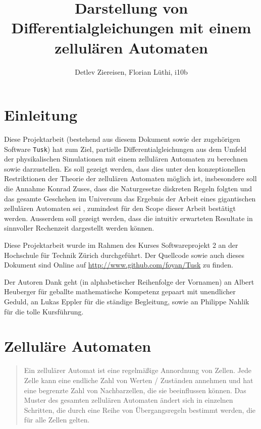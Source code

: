 \documentclass[11pt]{article} %
\title{Darstellung von Differentialgleichungen mit einem zellulären Automaten}
\author{Detlev Ziereisen, Florian Lüthi, i10b}
\theoremstyle{definition}
\begin{document}
\maketitle

\tableofcontents

\section{Einleitung}

Diese Projektarbeit (bestehend aus diesem Dokument sowie der zugehörigen Software {\tt Tusk}) hat zum Ziel, partielle Differentialgleichungen aus dem Umfeld der physikalischen Simulationen mit einem zellulären Automaten zu berechnen sowie darzustellen. Es soll gezeigt werden, dass dies unter den konzeptionellen Restriktionen der Theorie der zellulären Automaten möglich ist, insbesondere soll die Annahme Konrad Zuses, dass die Naturgesetze diskreten Regeln folgten und das gesamte Geschehen im Universum das Ergebnis der Arbeit eines gigantischen zellulären Automaten sei \cite{wiki:zellautomat, zuse1969}, zumindest für den Scope dieser Arbeit bestätigt werden. Ausserdem soll gezeigt werden, dass die intuitiv erwarteten Resultate in sinnvoller Rechenzeit dargestellt werden können.

Diese Projektarbeit wurde im Rahmen des Kurses Softwareprojekt 2 an der Hochschule für Technik Zürich durchgeführt. Der Quellcode sowie auch dieses Dokument sind Online auf \url{http://www.github.com/foyan/Tusk} zu finden.

Der Autoren Dank geht (in alphabetischer Reihenfolge der Vornamen) an Albert Heuberger für geballte mathematische Kompetenz gepaart mit unendlicher Geduld, an Lukas Eppler für die ständige Begleitung, sowie an Philippe Nahlik für die tolle Kursführung.

\section{Zelluläre Automaten}

\begin{quote}Ein zellulärer Automat ist eine regelmäßige Annordnung von Zellen. Jede Zelle kann eine endliche Zahl
von Werten / Zuständen annehmen und hat eine begrenzte Zahl von Nachbarzellen, die sie beeinflussen
können. Das Muster des gesamten zellulären Automaten ändert sich in einzelnen Schritten, die durch eine
Reihe von Übergangsregeln bestimmt werden, die für alle Zellen gelten.\cite{beckmann}\end{quote}
\end{document}
